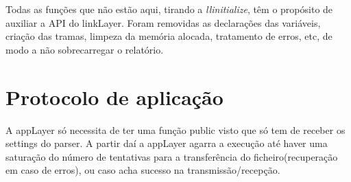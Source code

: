 \documentclass[a4paper]{article}
\begin{document}
Todas as funções que não estão aqui, tirando a \textit{llinitialize}, têm o
propósito de auxiliar a API do linkLayer. Foram removidas as declarações das
variáveis, criação das tramas, limpeza da memória alocada, tratamento de erros,
etc, de modo a não sobrecarregar o relatório.

\section{Protocolo de aplicação}
A appLayer só necessita de ter uma função public visto que só tem de receber os
settings do parser. A partir daí a appLayer agarra a execução até haver uma
saturação do número de tentativas para a transferência do ficheiro(recuperação
em caso de erros), ou caso acha sucesso na transmissão/recepção.
\end{document}
